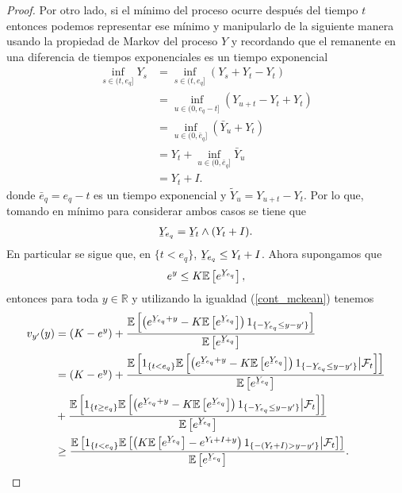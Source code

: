 \begin{proof}
Por otro lado, si el mínimo del proceso ocurre después del tiempo $t$ entonces podemos representar ese mínimo y manipularlo de la siguiente manera usando la propiedad de Markov del proceso $Y$ y recordando que el remanente en una diferencia de tiempos exponenciales es un tiempo exponencial
\begin{align*}
	\inf_{s \in (t, e_q]} Y_s & = \inf_{s \in (t, e_q]} (Y_s + Y_t - Y_t) \\
	& = \inf_{u \in (0, e_q - t]} (Y_{u+t} - Y_t + Y_t) \\
    & = \inf_{u \in (0, \bar{e}_q]} (\bar{Y}_u + Y_t) \\
    & = Y_t + \inf_{u \in (0, \bar{e}_q]} \bar{Y}_u\\
    & = Y_t + I.
\end{align*}
donde $\bar{e}_q = e_q - t$ es un tiempo exponencial y $\tilde{Y}_u = Y_{u+t} - Y_t$. Por lo que, tomando en mínimo para considerar ambos casos se tiene que
\begin{align*}
	\ubar{Y}_{e_q} = \ubar{Y}_t \wedge (Y_t + I).
\end{align*}
En particular se sigue que, en $\{ t < e_q \}$, $\ubar{Y}_{e_q} \leq Y_t + I$. Ahora supongamos que 
\begin{align}
e^y \leq K \mathbb{E} \left[ e^{\ubar{Y}_{e_q}} \right], \label{mckean_eq4}
\end{align}
entonces para toda $y \in \mathbb{R}$ y utilizando la igualdad (\ref{cont_mckean}) tenemos
\begin{align*}
v_{y'}(y) & = (K - e^{y}) + \frac{ \mathbb{E} \left[ \left( e^{\ubar{Y}_{e_q} + y} - K \mathbb{E} \left[ e^{\ubar{Y}_{e_q}} \right] \right) 1_{\{ - \ubar{Y}_{e_q} \leq y - y'\}} \right] }{ \mathbb{E} \left[ e^{\ubar{Y}_{e_q}} \right] } \\
	& = (K - e^{y}) + \frac{ \mathbb{E} \left[ 1_{\{ t < e_q \}} \mathbb{E} \left[ \left( e^{\ubar{Y}_{e_q} + y} - K \mathbb{E} \left[ e^{\ubar{Y}_{e_q}} \right] \right) 1_{\{ - \ubar{Y}_{e_q} \leq y - y'\}} \big| \mathcal{F}_t \right] \right] }{ \mathbb{E} \left[ e^{\ubar{Y}_{e_q}} \right] } \\
& + \frac{ \mathbb{E} \left[ 1_{\{ t \geq e_q \}} \mathbb{E} \left[ \left( e^{\ubar{Y}_{e_q} + y} - K \mathbb{E} \left[ e^{\ubar{Y}_{e_q}} \right] \right) 1_{\{ - \ubar{Y}_{e_q} \leq y - y'\}} \big| \mathcal{F}_t \right] \right] }{ \mathbb{E} \left[ e^{\ubar{Y}_{e_q}} \right] } \\
& \geq \frac{\mathbb{E} \left[ 1_{ \{t < e_q \}} \mathbb{E} \left[ \left( K  \mathbb{E} \left[ e^{\ubar{Y}_{e_q}} \right] - e^{Y_t + I + y} \right) 1_{\{ - (Y_t + I) > y - y'\}} \big| \mathcal{
F}_t \right] \right]}{ \mathbb{E} \left[ e^{\ubar{Y}_{e_q}} \right] }.
\end{align*}


\end{proof}
